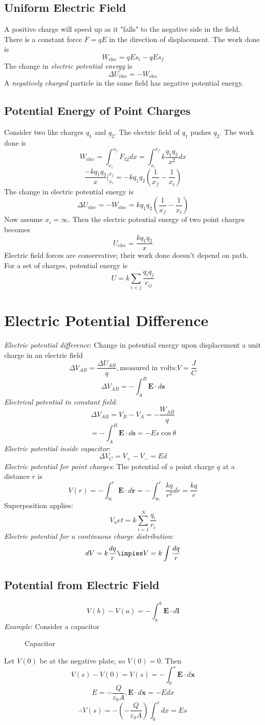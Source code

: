 \subsection{Uniform Electric Field}
A positive charge will speed up as it "falls" to the negative side in the field.\\
There is a constant force $F=qE$ in the direction of displacement. The work done is
$$W_{\text{elec}}=qEs_i-qEs_f$$
The change in \emph{electric potential energy} is
$$\Delta U_{\text{elec}}=-W_{\text{elec}}$$
A \emph{negatively charged} particle in the same field has negative potential energy.
\subsection{Potential Energy of Point Charges}
Consider two like charges $q_1$ and $q_2$. The electric field of $q_1$ pushes $q_2$. The work done is
$$W_{\text{elec}}=\int_{x_i}^{x_f}F_{12}dx=\int_{x_i}^{x_f}k\frac{q_1q_2}{x^2}dx$$
$$\frac{-kq_1q_2}{x}\vert_{x_i}^{x_f}=-kq_1q_2(\frac{1}{x_f}-\frac{1}{x_i})$$
The change in electric potential energy is
$$\Delta U_{\text{elec}}=-W_{\text{elec}}=kq_1q_2(\frac{1}{x_f}-\frac{1}{x_i})$$
Now assume $x_i=\infty$. Then the electric potential energy of two point charges becomes
$$U_{\text{elec}}=\frac{kq_1q_2}{x}$$
Electric field forces are conservative; their work done doesn't depend on path.\\
For a set of charges, potential energy is
$$U=k\sum_{i<j}\frac{q_iq_j}{r_{ij}}$$
\section{Electric Potential Difference}
\emph{Electric potential difference}: Change in potential energy upon 
displacement a unit charge in an electric field
$$\Delta V_{AB}=\frac{\Delta U_{AB}}{q}, \text{measured in volts:} V=\frac{J}{C}$$
$$\Delta V_{AB} = - \int_A^B\mathbf{E}\cdot d\mathbf{s}$$
\emph{Electrical potential in constant field}:
$$\Delta V_{AB}=V_B-V_A=-\frac{W_{AB}}{q}$$
$$=-\int_A^B\mathbf{E}\cdot d\mathbf{s}=-Es\cos{\theta}$$
\emph{Electric potential inside capacitor}:
$$\Delta V_C = V_+ - V_- = Ed$$
\emph{Electric potential for point charges}: The potential of a point charge $q$ at a distance $r$ is
$$V(r)=-\int_\infty^r\mathbf{E}\cdot d\mathbf{r} = -\int_\infty^r\frac{kq}{r^2}dr=\frac{kq}{r}$$
Superposition applies:
$$V_net=k\sum_{i=1}^N\frac{q_i}{r_i}$$
\emph{Electric potential for a continuous charge distribution}:
$$dV=k\frac{dq}{r}\impies V=k\int\frac{dq}{r}$$
\subsection{Potential from Electric Field}
$$V(b) - V(a)=-\int_a^b\mathbf{E}\cdot d\mathbf{l}$$
\emph{Example}:
Consider a capacitor
\begin{figure}[H]
    \centering
    
    \caption{Capacitor}
\end{figure}
Let $V(0)$ be at the negative plate, so $V(0)=0$. Then
$$V(s)-V(0)=V(s)=-\int_0^s\mathbf{E}\cdot d\mathbf{x}$$
$$E=-\frac{Q}{\varepsilon_0A},\mathbf{E}\cdot d\mathbf{x}=-Edx$$
$$\therefore V(s)=-(-\frac{Q}{\varepsilon_0A})\int_0^sdx=Es$$
